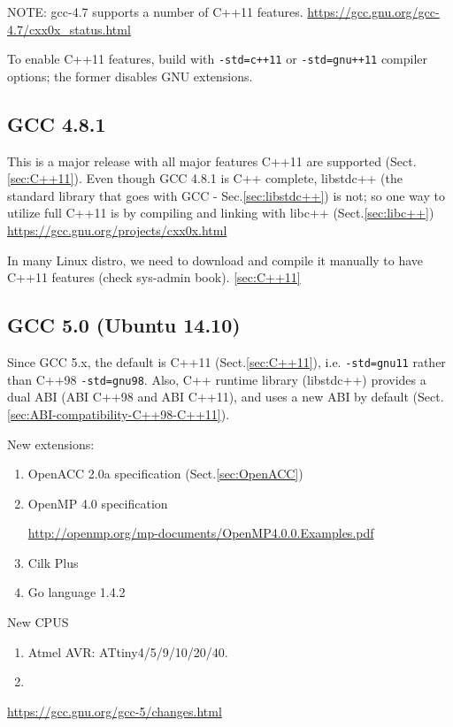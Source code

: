 NOTE: gcc-4.7 supports a number of C++11 features.
 \url{https://gcc.gnu.org/gcc-4.7/cxx0x_status.html}

To enable C++11 features, build with
\verb!-std=c++11! or \verb!-std=gnu++11! compiler
options; the former disables GNU extensions.

\subsection{GCC 4.8.1}

This is a major release with all major features C++11 are supported
(Sect.\ref{sec:C++11}). Even though GCC 4.8.1 is C++ complete, libstdc++ (the
standard library that goes with GCC - Sec.\ref{sec:libstdc++}) is not; so one way to
utilize full C++11 is by compiling and linking with libc++ (Sect.\ref{sec:libc++})
\url{https://gcc.gnu.org/projects/cxx0x.html}

In many Linux distro, we need to download and compile it manually to have C++11
features (check sys-admin book). 
\ref{sec:C++11}

\subsection{GCC 5.0 (Ubuntu 14.10)}
\label{sec:GCC-5.0}

Since GCC 5.x, the default is C++11 (Sect.\ref{sec:C++11}), i.e.
\verb!-std=gnu11! rather than C++98 \verb!-std=gnu98!. Also, C++ runtime library
(libstdc++) provides a dual ABI (ABI C++98 and ABI C++11), and uses a new ABI by
default (Sect.\ref{sec:ABI-compatibility-C++98-C++11}).

New extensions:
\begin{enumerate}
  \item OpenACC 2.0a specification (Sect.\ref{sec:OpenACC})
  
  \item OpenMP 4.0 specification
  
  \url{http://openmp.org/mp-documents/OpenMP4.0.0.Examples.pdf}
  
  
  \item Cilk Plus
  
  \item Go language 1.4.2 
\end{enumerate}

New CPUS
\begin{enumerate}
  \item Atmel AVR: ATtiny4/5/9/10/20/40. 
  
  \item 
\end{enumerate}
\url{https://gcc.gnu.org/gcc-5/changes.html}


